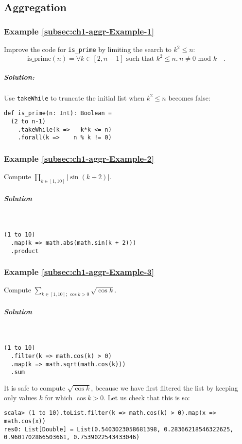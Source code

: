 \subsection{Aggregation\label{subsec:Aggregation-solved-examples}}

\subsubsection{Example \label{subsec:ch1-aggr-Example-1}\ref{subsec:ch1-aggr-Example-1}}

Improve the code for \lstinline!is_prime! by limiting the search
to $k^{2}\leq n$:
\[
\text{is\_prime}\left(n\right)=\forall k\in\left[2,n-1\right]\text{ such that }k^{2}\leq n.\ n\neq0\text{ mod }k\quad.
\]


\subparagraph{Solution:}

Use \lstinline!takeWhile! to truncate the initial list when $k^{2}\leq n$
becomes false:
\begin{lstlisting}
def is_prime(n: Int): Boolean =
  (2 to n-1)
    .takeWhile(k =>   k*k <= n)
    .forall(k =>    n % k != 0)
\end{lstlisting}


\subsubsection{Example \label{subsec:ch1-aggr-Example-2}\ref{subsec:ch1-aggr-Example-2}}

Compute $\prod_{k\in\left[1,10\right]}\left|\sin\left(k+2\right)\right|$.

\subparagraph{Solution}

~
\begin{lstlisting}
(1 to 10)
  .map(k => math.abs(math.sin(k + 2)))
  .product
\end{lstlisting}


\subsubsection{Example \label{subsec:ch1-aggr-Example-3}\ref{subsec:ch1-aggr-Example-3}}

Compute $\sum_{k\in[1,10];~\cos k>0}\sqrt{\cos k}$.

\subparagraph{Solution}

~

\begin{lstlisting}
(1 to 10)
  .filter(k => math.cos(k) > 0)
  .map(k => math.sqrt(math.cos(k)))
  .sum
\end{lstlisting}
It is safe to compute $\sqrt{\cos k}$, because we have first filtered
the list by keeping only values $k$ for which $\cos k>0$. Let us
check that this is so:
\begin{lstlisting}
scala> (1 to 10).toList.filter(k => math.cos(k) > 0).map(x => math.cos(x))
res0: List[Double] = List(0.5403023058681398, 0.28366218546322625, 0.9601702866503661, 0.7539022543433046)
\end{lstlisting}


